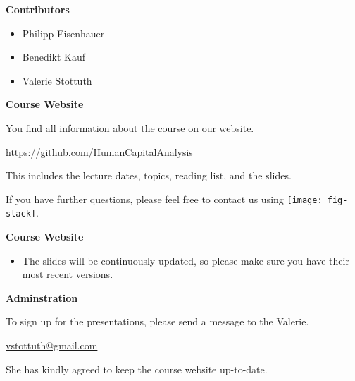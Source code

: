 \begin{frame}\textbf{Contributors}\vspace{0.3cm}

\begin{itemize}\setlength\itemsep{1em}
\item Philipp Eisenhauer
\item Benedikt Kauf
\item Valerie Stottuth
\end{itemize}

\end{frame}
\begin{frame}
	\textbf{Course Website}\vspace{0.3cm}

You find all information about the course on our website.

\begin{center}
\url{https://github.com/HumanCapitalAnalysis}
\end{center}

This includes the lecture dates, topics, reading list, and the slides.\vspace{0.3cm}

If you have further questions, please feel free to contact us using
\texttt{[image: fig-slack]}.

\end{frame}
\begin{frame}
	\textbf{Course Website}\vspace{0.3cm}

\begin{itemize}
\item The slides will be continuously updated, so please make sure you have their most recent versions.
\end{itemize}

\end{frame}
\begin{frame}
	\textbf{Adminstration}\vspace{0.3cm}

To sign up for the presentations, please send a message to the Valerie.

\begin{center}
\href{mailto:vstottuth@gmail.com}{vstottuth@gmail.com}
\end{center}

She has kindly agreed to keep the course website up-to-date.

\end{frame}

